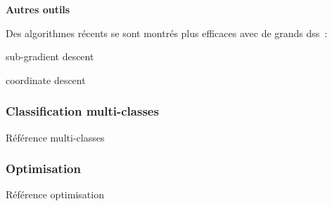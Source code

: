 \textbf{Autres outils}

Des algorithmes récents se sont montrés plus efficaces avec de grands \glspl{ds} :

\begin{itmz}
\item{sub-gradient descent}
\item{coordinate descent}
\end{itmz}

\subsubsection{Classification multi-classes}

Référence multi-classes \cite{multi-class}

\subsubsection{Optimisation}

Référence optimisation \cite{mri} \cite{optimization}

\pagebreak
